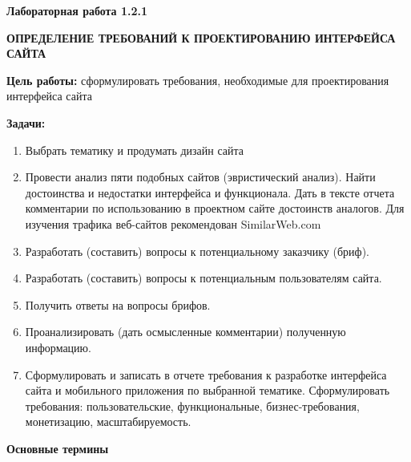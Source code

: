 
\graphicspath{ {1.2.1/models/} }

\pagestyle{fancy}
\fancyhead{}
\renewcommand{\headrulewidth}{0pt}


\begin{center}
    \textbf{Лабораторная работа 1.2.1}

    \textbf{ОПРЕДЕЛЕНИЕ ТРЕБОВАНИЙ К ПРОЕКТИРОВАНИЮ ИНТЕРФЕЙСА САЙТА}
\end{center}

\textbf{Цель работы:} сформулировать требования, необходимые для проектирования интерфейса сайта
\bigskip

\textbf{Задачи:}

\begin{enumerate}
    \item Выбрать тематику и продумать дизайн сайта
    \item Провести анализ пяти подобных сайтов (эвристический анализ). Найти достоинства и недостатки интерфейса и функционала. Дать в тексте отчета комментарии по использованию в проектном сайте достоинств аналогов. Для изучения трафика веб-сайтов рекомендован SimilarWeb.com 
    \item Разработать (составить) вопросы к потенциальному заказчику (бриф).
    \item Разработать (составить) вопросы к потенциальным пользователям сайта.
    \item Получить ответы на вопросы брифов.
    \item Проанализировать (дать осмысленные комментарии) полученную информацию.
    \item Сформулировать и записать в отчете требования к разработке интерфейса сайта и мобильного приложения по выбранной тематике. Сформулировать требования: пользовательские, функциональные, бизнес-требования, монетизацию, масштабируемость.
\end{enumerate}
\bigskip

\textbf{Основные термины}

